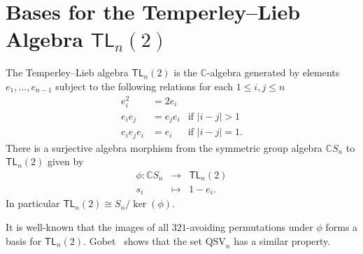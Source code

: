 \documentclass[12pt]{amsart}
\theoremstyle{definition}
\theoremstyle{remark}
\newtheorem{rem}[equation]{Remark}
\numberwithin{equation}{section}
\newcommand{\CC}{\mathbb{C}}
\newcommand{\TL}{\mathsf{TL}}
\newcommand{\QSV}{\mathrm{QSV}}
\begin{document}
% 


\section{Bases for the Temperley--Lieb Algebra $\TL_{n}(2)$}
\label{sec:TLbasis}

The Temperley--Lieb algebra $\TL_{n}(2)$ is the $\CC$-algebra generated by elements $e_{1}, \ldots, e_{n-1}$ subject to the following relations for each $1 \le i, j \le n$
\[
\begin{array}{rll}
e_{i}^{2} &= 2 e_{i} \\
e_{i}e_{j} &= e_{j}e_{i} & \text{if $|i - j| > 1$} \\
e_{i} e_{j} e_{i} &= e_{i} & \text{if $|i - j| = 1$}.
\end{array}
\]
There is a surjective algebra morphism from the symmetric group algebra $\CC S_{n}$ to $\TL_{n}(2)$ given by 
\[
\begin{array}{rcl}
\phi: \CC S_{n} & \longrightarrow & \TL_{n}(2) \\
s_{i} & \longmapsto & 1 - e_{i}.
\end{array}
\]
In particular $\TL_{n}(2)\cong S_n\big/\!\ker(\phi)$.

It is well-known that the images of all $321$-avoiding permutations under $\phi$ forms a basis for $\TL_{n}(2)$.  
Gobet~\cite{Gobet} shows that the set $\QSV_{n}$ has a similar property.


\end{document}
